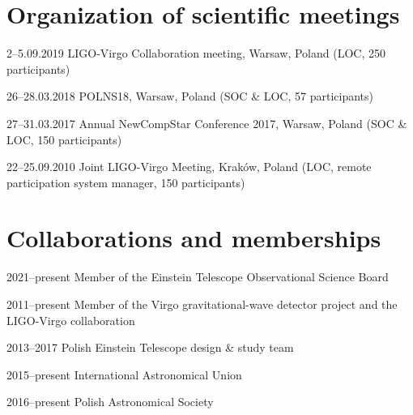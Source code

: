 \documentclass[]{friggeri-cv} %
\begin{document}
\vskip 0.5cm 
\section{Organization of scientific meetings}

\begin{entrylistshort}

\entrys
{2--5.09.2019} 
{LIGO-Virgo Collaboration meeting, Warsaw, Poland (LOC, 250 participants)} 

\entrys
{26--28.03.2018} 
{POLNS18, Warsaw, Poland (SOC \& LOC, 57 participants)} 

\entrys
{27--31.03.2017} 
{Annual NewCompStar Conference 2017, Warsaw, Poland (SOC \& LOC, 150 participants)} 
 

\entrys 
{22--25.09.2010} 
{Joint LIGO-Virgo Meeting, Kraków, Poland (LOC, remote participation system manager, 150 participants)} 

\end{entrylistshort}


\vskip 0.5cm 
\section{Collaborations and memberships}

\begin{entrylistshort}

\entrys 
{2021--present} 
{Member of the Einstein Telescope Observational Science Board}

\entrys
{2011--present} 
{Member of the Virgo gravitational-wave detector project and the LIGO-Virgo collaboration}

\entrys
{2013--2017} 
{Polish Einstein Telescope design \& study team}

\entrys 
{2015--present}
{International Astronomical Union} 

\entrys
{2016--present}
{Polish Astronomical Society} 

\end{entrylistshort}



%
%
%
%
% 



\end{document}
